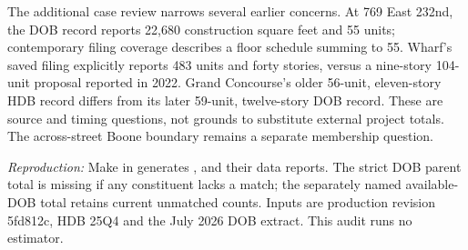 The additional case review narrows several earlier concerns. At 769 East 232nd, the DOB record reports 22,680 construction square feet and 55 units; contemporary filing coverage describes a floor schedule summing to 55. Wharf's saved filing explicitly reports 483 units and forty stories, versus a nine-story 104-unit proposal reported in 2022. Grand Concourse's older 56-unit, eleven-story HDB record differs from its later 59-unit, twelve-story DOB record. These are source and timing questions, not grounds to substitute external project totals. The across-street Boone boundary remains a separate membership question.

\textit{Reproduction:} Make in  generates ,  and their data reports. The strict DOB parent total is missing if any constituent lacks a match; the separately named available-DOB total retains current unmatched counts. Inputs are production revision 5fd812c, HDB 25Q4 and the July 2026 DOB extract. This audit runs no estimator.
